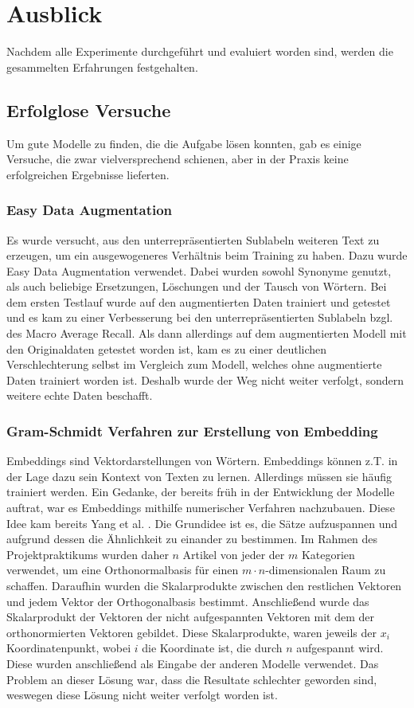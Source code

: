 \section{Ausblick}
\label{Ausblick}
Nachdem alle Experimente durchgeführt und evaluiert worden sind, werden die gesammelten Erfahrungen festgehalten.

\subsection{Erfolglose Versuche}
Um gute Modelle zu finden, die die Aufgabe lösen konnten, gab es einige Versuche, die zwar vielversprechend schienen, aber in der Praxis keine erfolgreichen Ergebnisse lieferten.

\subsubsection{Easy Data Augmentation}
\label{EDA}
Es wurde versucht, aus den unterrepräsentierten Sublabeln weiteren Text zu erzeugen, um ein ausgewogeneres Verhältnis beim Training zu haben. Dazu wurde Easy Data Augmentation \cite{Wei2019} verwendet. Dabei wurden sowohl Synonyme genutzt, als auch beliebige Ersetzungen, Löschungen und der Tausch von Wörtern. Bei dem ersten Testlauf wurde auf den augmentierten Daten trainiert und getestet und es kam zu einer Verbesserung bei den unterrepräsentierten Sublabeln bzgl. des Macro Average Recall. Als dann allerdings auf dem augmentierten Modell mit den Originaldaten getestet worden ist, kam es zu einer deutlichen Verschlechterung selbst im Vergleich zum Modell, welches ohne augmentierte Daten trainiert worden ist. Deshalb wurde der Weg nicht weiter verfolgt, sondern weitere echte Daten beschafft.

\subsubsection{Gram-Schmidt Verfahren zur Erstellung von Embedding}
Embeddings sind Vektordarstellungen von Wörtern. Embeddings können z.T. in der Lage dazu sein Kontext von Texten zu lernen. Allerdings müssen sie häufig trainiert werden. \cite{Almeida2019} Ein Gedanke, der bereits früh in der Entwicklung der Modelle auftrat, war es Embeddings mithilfe numerischer Verfahren nachzubauen. Diese Idee kam bereits Yang et al. \cite{Yang2019}. Die Grundidee ist es, die Sätze aufzuspannen und aufgrund dessen die Ähnlichkeit zu einander zu bestimmen. Im Rahmen des Projektpraktikums wurden daher $n$ Artikel von jeder der $m$ Kategorien verwendet, um eine Orthonormalbasis für einen $m \cdot n$-dimensionalen Raum zu schaffen. Daraufhin wurden die Skalarprodukte zwischen den restlichen Vektoren und jedem Vektor der Orthogonalbasis bestimmt. Anschließend wurde das Skalarprodukt der Vektoren der nicht aufgespannten Vektoren mit dem der orthonormierten Vektoren gebildet. Diese Skalarprodukte, waren jeweils der $x_i$ Koordinatenpunkt, wobei $i$ die Koordinate ist, die durch $n$ aufgespannt wird. Diese wurden anschließend als Eingabe der anderen Modelle verwendet. Das Problem an dieser Lösung war, dass die Resultate schlechter geworden sind, weswegen diese Lösung nicht weiter verfolgt worden ist.

